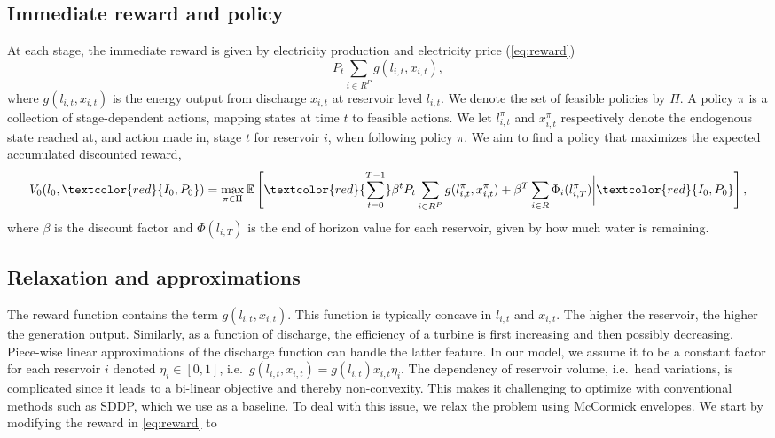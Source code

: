 \subsection{Immediate reward and policy}
At each stage, the immediate reward is given by electricity production and electricity price (\ref{eq:reward})
\begin{equation}
    P_{t}\sum_{i\in R^P}g(l_{i,t},x_{i,t}),
    \label{eq:reward}
\end{equation}
where $g(l_{i,t},x_{i,t})$ is the energy output from discharge $x_{i,t}$ at reservoir level $l_{i,t}$. We denote the set of feasible policies by $\Pi$. A policy $\pi$ is a collection of stage-dependent actions, mapping states at time $t$ to feasible actions. We let $l_{i,t}^{\pi}$ and $x_{i,t}^{\pi}$ respectively denote the endogenous state reached at, and action made in, stage $t$ for reservoir $i$, when following policy $\pi$. We aim to find a policy that maximizes the expected accumulated discounted reward,
\begin{equation}
\label{eq:objective_function_bilinear}
\begin{split}
    V_0(l_0, \textcolor{red}{I_0,P_0}) =  \max_{\pi \in \Pi} \mathbb{E}\left[\textcolor{red}{\sum_{t=0}^{T-1}}\beta^{t}P_{t}\sum_{i\in R^P}g(l^{\pi}_{i,t},x^{\pi}_{i,t}) + \beta^{T}\sum_{i\in R}\Phi_{i}(l^{\pi}_{i,T})\bigg|\textcolor{red}{I_0,P_0}\right],
\end{split}
\end{equation}
where $\beta$ is the discount factor and $\Phi(l_{i,T})$ is the end of horizon value for each reservoir, given by how much water is remaining.

\subsection{Relaxation and approximations}
The reward function contains the term $g(l_{i,t},x_{i,t})$. This function is typically concave in $l_{i,t}$ and $x_{i,t}$. The higher the reservoir, the higher the generation output. Similarly, as a function of discharge, the efficiency of a turbine is first increasing and then possibly decreasing. Piece-wise linear approximations of the discharge function can handle the latter feature. In our model, we assume it to be a constant factor for each reservoir $i$ denoted $\eta_{i} \in[0,1]$, i.e.\ $g(l_{i,t},x_{i,t})=g(l_{i,t})x_{i,t}\eta_i$. The dependency of reservoir volume, i.e.\ head variations, is complicated since it leads to a bi-linear objective and thereby non-convexity. This makes it challenging to optimize with conventional methods such as SDDP, which we use as a baseline. To deal with this issue, we relax the problem using McCormick envelopes. We start by modifying the reward in \eqref{eq:reward} to 

